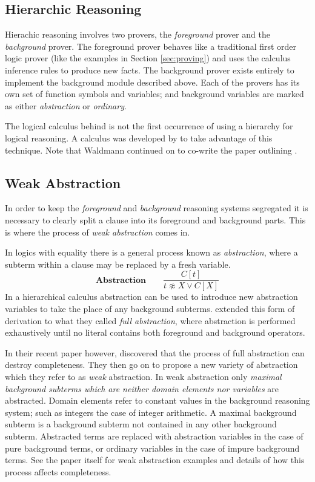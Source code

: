 \subsection{Hierarchic Reasoning}
\label{sec:hier}

Hierachic reasoning involves two provers, the \emph{foreground} prover and the
\emph{background} prover. The foreground prover behaves like a traditional first
order logic prover (like the examples in Section \ref{sec:proving}) and uses the
calculus inference rules to produce new facts. The background prover exists entirely
to implement the background module described above. Each of the provers has its own
set of function symbols and variables; and background variables are marked as either
\emph{abstraction} or \emph{ordinary}.



The logical calculus behind {\beagle} is not the first occurrence of using a hierarchy for
logical reasoning. A calculus was developed by  to take advantage
of this technique. Note that Waldmann continued on to co-write the paper outlining
{\HSWA} \cite{baum13}.

\subsection{Weak Abstraction}
In order to keep the \emph{foreground} and \emph{background} reasoning
systems segregated it is necessary to clearly split a clause into its foreground
and background parts. This is where the process of \emph{weak abstraction} comes in.

In logics with equality there is a general process known as \emph{abstraction},
where a subterm within a clause may be replaced by a fresh variable.
\[\textbf{Abstraction}\quad\quad \frac{C[t]}{t\not\approx X \lor C[X]}\]
In a hierarchical calculus abstraction can be used to introduce new abstraction variables to take the place
of any background subterms.  extended this form of derivation to what they called \emph{full abstraction},
where abstraction is performed exhaustively until no literal contains both foreground
and background operators.

In their recent paper however,  discovered that the process 
of full abstraction can destroy completeness. They then go on to propose a new
variety of abstraction which they refer to as \emph{weak} abstraction. 
In weak abstraction only \emph{maximal background subterms which are
neither domain elements nor variables} are abstracted. Domain elements refer
to constant values in the background reasoning system; such as integers the case of
integer arithmetic. A maximal background subterm
is a background subterm not contained in any other background subterm. Abstracted terms are replaced
with abstraction variables in the case of pure background terms, or ordinary variables
in the case of impure background terms. See the paper itself for weak abstraction
examples and details of how this process affects completeness.

